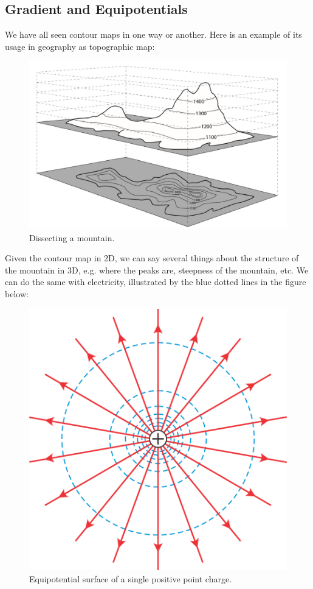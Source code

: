 \documentclass[11pt, letterpaper]{article}
\begin{document}
	\newpage
	
	\subsection{Gradient and Equipotentials}
	We have all seen contour maps in one way or another. Here is an example of its usage in 
	geography as topographic map:
	\begin{figure}[h!]
		\centering 
		\includegraphics[scale=0.15]{contour}
		\caption{Dissecting a mountain.}
	\end{figure}
	
	Given the contour map in 2D, we can say several things about the structure of the mountain
	in 3D, e.g. where the peaks are, steepness of the mountain, etc. We can do the same with 
	electricity, illustrated by the blue dotted lines in the figure below:
	\begin{figure}[h!]
		\centering
		\includegraphics[scale=1.7]{equipotent}
		\caption{Equipotential surface of a single positive point charge.}
	\end{figure}
	
\end{document}

